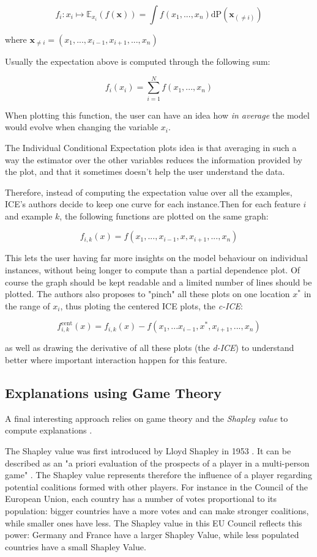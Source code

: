 \documentclass[a4paper,11pt]{kth-mag}
\begin{document}
\[
	f_i : x_i \mapsto \mathbb{E}_{x_i} (f(\mathbf{x})) = \int f(x_1, ..., x_n) \mathrm{dP}(\mathbf{x}_{(\neq i)})
\]

where $\mathbf{x}_{\neq i} = (x_1, ..., x_{i-1}, x_{i+1}, ..., x_n)$

Usually the expectation above is computed through the following sum:

\[
	f_i(x_i) = \sum_{i=1}^{N} f(x_1,... , x_n)
\]

When plotting this function, the user can have an idea how \textit{in average} the model would evolve when changing the variable $x_i$.

The Individual Conditional Expectation plots idea is that averaging in such a way the estimator over the other variables reduces the information provided by the plot, and that it sometimes doesn't help the user understand the data.

Therefore, instead of computing the expectation value over all the examples, ICE's authors decide to keep one curve for each instance.Then for each feature $i$ and example $k$, the following functions are plotted on the same graph:

\[
	f_{i,k}(x) = f(x_1, ..., x_{i-1}, x, x_{i+1}, ..., x_n)
\]

This lets the user having far more insights on the model behaviour on individual instances, without being longer to compute than a partial dependence plot. Of course the graph should be kept readable and a limited number of lines should be plotted. The authors also proposes to "pinch" all these plots on one location $x^*$ in the range of $x_i$, thus ploting the centered ICE plots, the \textit{c-ICE}:

\[
	f^\mathrm{cent}_{i,k}(x) = f_{i,k}(x) - f(x_1, ... x_{i-1}, x^*, x_{i+1}, ..., x_n)
\]

as well as drawing the derivative of all these plots (the \textit{d-ICE}) to understand better where important interaction happen for this feature.

\subsection{Explanations using Game Theory}

A final interesting approach relies on game theory and the \textit{Shapley value} to compute explanations \cite{gametheory}.

The Shapley value was first introduced by Lloyd Shapley in 1953 \cite{shapleyvalue}. It can be described as an "a priori evaluation of the prospects of a player in a multi-person game" \cite{hart1989shapley}. The Shapley value represents therefore the influence of a player regarding potential coalitions formed with other players. For instance in the Council of the European Union, each country has a number of votes proportional to its population: bigger countries have a more votes and can make stronger coalitions, while smaller ones have less. The Shapley value in this EU Council reflects this power: Germany and France have a larger Shapley Value, while less populated countries have a small Shapley Value. 
\end{document}
